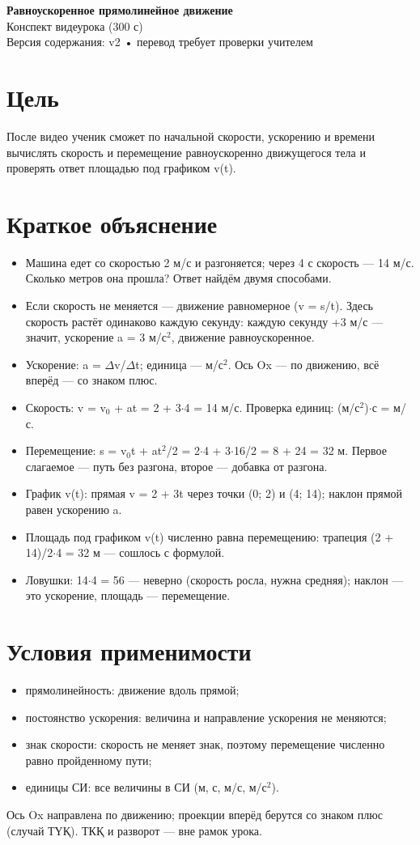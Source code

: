 \documentclass[11pt]{article}
\begin{document}
{\Large\bfseries Равноускоренное прямолинейное движение}\\[2mm]
Конспект видеурока (300 с)\\[1mm]
{\small Версия содержания: v2 • перевод требует проверки учителем}
\vspace{4mm}
\section*{Цель}
После видео ученик сможет по начальной скорости, ускорению и времени вычислять скорость и перемещение равноускоренно движущегося тела и проверять ответ площадью под графиком v(t).
\section*{Краткое объяснение}
\begin{itemize}
\item Машина едет со скоростью 2 м/с и разгоняется; через 4 с скорость — 14 м/с. Сколько метров она прошла? Ответ найдём двумя способами.
\item Если скорость не меняется — движение равномерное (v = s/t). Здесь скорость растёт одинаково каждую секунду: каждую секунду +3 м/с — значит, ускорение a = 3 м/с$^2$, движение равноускоренное.
\item Ускорение: a = $\Delta$v/$\Delta$t; единица — м/с$^2$. Ось Ox — по движению, всё вперёд — со знаком плюс.
\item Скорость: v = v$_0$ + at = 2 + 3$\cdot$4 = 14 м/с. Проверка единиц: (м/с$^2$)$\cdot$с = м/с.
\item Перемещение: s = v$_0$t + at$^2$/2 = 2$\cdot$4 + 3$\cdot$16/2 = 8 + 24 = 32 м. Первое слагаемое — путь без разгона, второе — добавка от разгона.
\item График v(t): прямая v = 2 + 3t через точки (0; 2) и (4; 14); наклон прямой равен ускорению a.
\item Площадь под графиком v(t) численно равна перемещению: трапеция (2 + 14)/2$\cdot$4 = 32 м — сошлось с формулой.
\item Ловушки: 14$\cdot$4 = 56 — неверно (скорость росла, нужна средняя); наклон — это ускорение, площадь — перемещение.
\end{itemize}
\section*{Условия применимости}
\begin{itemize}
\item прямолинейность: движение вдоль прямой;
\item постоянство ускорения: величина и направление ускорения не меняются;
\item знак скорости: скорость не меняет знак, поэтому перемещение численно равно пройденному пути;
\item единицы СИ: все величины в СИ (м, с, м/с, м/с$^2$).
\end{itemize}
Ось Ox направлена по движению; проекции вперёд берутся со знаком плюс (случай ТҮҚ). ТКҚ и разворот — вне рамок урока.
\end{document}

